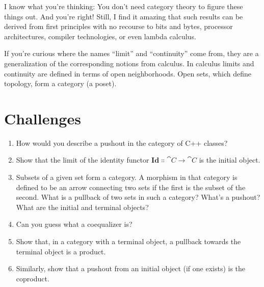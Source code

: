 I know what you're thinking: You don't need category theory to figure
these things out. And you're right! Still, I find it amazing that such
results can be derived from first principles with no recourse to bits
and bytes, processor architectures, compiler technologies, or even
lambda calculus.

If you're curious where the names ``limit'' and ``continuity'' come
from, they are a generalization of the corresponding notions from
calculus. In calculus limits and continuity are defined in terms of open
neighborhoods. Open sets, which define topology, form a category (a
poset).

\section{Challenges}

\begin{enumerate}
\tightlist
\item
  How would you describe a pushout in the category of C++ classes?
\item
  Show that the limit of the identity functor
  $\mathbf{Id} \Colon \cat{C} \to \cat{C}$ is the initial object.
\item
  Subsets of a given set form a category. A morphism in that category is
  defined to be an arrow connecting two sets if the first is the subset
  of the second. What is a pullback of two sets in such a category?
  What's a pushout? What are the initial and terminal objects?
\item
  Can you guess what a coequalizer is?
\item
  Show that, in a category with a terminal object, a pullback towards
  the terminal object is a product.
\item
  Similarly, show that a pushout from an initial object (if one exists)
  is the coproduct.
\end{enumerate}
